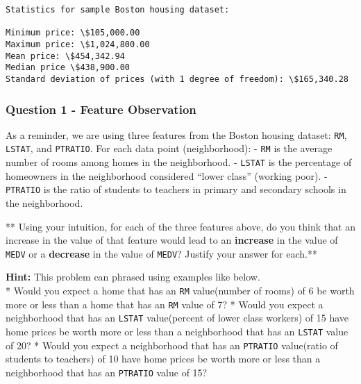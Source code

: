 \documentclass[11pt]{article}
\begin{document}
    \begin{Verbatim}[commandchars=\\\{\}]
Statistics for sample Boston housing dataset:

Minimum price: \$105,000.00
Maximum price: \$1,024,800.00
Mean price: \$454,342.94
Median price \$438,900.00
Standard deviation of prices (with 1 degree of freedom): \$165,340.28

    \end{Verbatim}

    \hypertarget{question-1---feature-observation}{%
\subsubsection{Question 1 - Feature
Observation}\label{question-1---feature-observation}}

As a reminder, we are using three features from the Boston housing
dataset: \texttt{\textquotesingle{}RM\textquotesingle{}},
\texttt{\textquotesingle{}LSTAT\textquotesingle{}}, and
\texttt{\textquotesingle{}PTRATIO\textquotesingle{}}. For each data
point (neighborhood): - \texttt{\textquotesingle{}RM\textquotesingle{}}
is the average number of rooms among homes in the neighborhood. -
\texttt{\textquotesingle{}LSTAT\textquotesingle{}} is the percentage of
homeowners in the neighborhood considered ``lower class'' (working
poor). - \texttt{\textquotesingle{}PTRATIO\textquotesingle{}} is the
ratio of students to teachers in primary and secondary schools in the
neighborhood.

** Using your intuition, for each of the three features above, do you
think that an increase in the value of that feature would lead to an
\textbf{increase} in the value of
\texttt{\textquotesingle{}MEDV\textquotesingle{}} or a \textbf{decrease}
in the value of \texttt{\textquotesingle{}MEDV\textquotesingle{}}?
Justify your answer for each.**

\textbf{Hint:} This problem can phrased using examples like below.\\
* Would you expect a home that has an
\texttt{\textquotesingle{}RM\textquotesingle{}} value(number of rooms)
of 6 be worth more or less than a home that has an
\texttt{\textquotesingle{}RM\textquotesingle{}} value of 7? * Would you
expect a neighborhood that has an
\texttt{\textquotesingle{}LSTAT\textquotesingle{}} value(percent of
lower class workers) of 15 have home prices be worth more or less than a
neighborhood that has an
\texttt{\textquotesingle{}LSTAT\textquotesingle{}} value of 20? * Would
you expect a neighborhood that has an
\texttt{\textquotesingle{}PTRATIO\textquotesingle{}} value(ratio of
students to teachers) of 10 have home prices be worth more or less than
a neighborhood that has an
\texttt{\textquotesingle{}PTRATIO\textquotesingle{}} value of 15?
\end{document}
